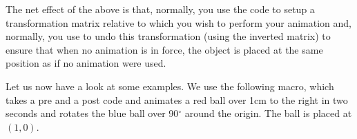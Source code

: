 \begin{command}{\pgfsys@animation@canvas@transform{}}
    The net effect of the above is that, normally, you use the  code
    to setup a transformation matrix relative to which you wish to perform your
    animation and, normally, you use  to undo this transformation
    (using the inverted matrix) to ensure that when no animation is in force,
    the object is placed at the same position as if no animation were used.

    Let us now have a look at some examples. We use the following macro, which
    takes a pre and a post code and animates a red ball over 1cm to the right
    in two seconds and rotates the blue ball over 90$^\circ$ around the origin.
    The ball is placed at $(1,0)$.
\begin{codeexample}
\def\animationcanvasexample#1#2{%
  \animationexample{ball}{}{%
    \pgfsysanimkeycanvastransform{#1}{#2}%
    \pgfsysanimkeytime{0}{1}{1}{0}{0}
    \pgfsysanimvaltranslate{0cm}{0cm}%
    \pgfsysanimkeytime{2}{1}{1}{0}{0}
    \pgfsysanimvaltranslate{1cm}{0cm}%
    \pgfsysanimate{translate}
    \fill [ball color=red,name=ball] (1,0) circle [radius=3mm]; }
  \animationexample{ball}{}{%
    \pgfsysanimkeycanvastransform{#1}{#2}%
    \pgfsysanimkeytime{0}{1}{1}{0}{0}
    \pgfsysanimvalscalar{0}%
    \pgfsysanimkeytime{2}{1}{1}{0}{0}
    \pgfsysanimvalscalar{90}%
    \pgfsysanimate{rotate}
    \fill [ball color=blue,name=ball] (1,0) circle [radius=3mm]; } }
\end{codeexample}
\def\animationcanvasexample#1#2{%
  \animationexample{ball}{}{%
    \pgfsysanimkeycanvastransform{#1}{#2}%
    \pgfsysanimkeytime{0}{1}{1}{0}{0}
    \pgfsysanimvaltranslate{0cm}{0cm}%
    \pgfsysanimkeytime{2}{1}{1}{0}{0}
    \pgfsysanimvaltranslate{1cm}{0cm}%
    \pgfsysanimate{translate}
    \fill [ball color=red,name=ball] (1,0) circle [radius=3mm]; }
  \animationexample{ball}{}{%
    \pgfsysanimkeycanvastransform{#1}{#2}%
    \pgfsysanimkeytime{0}{1}{1}{0}{0}
    \pgfsysanimvalscalar{0}%
    \pgfsysanimkeytime{2}{1}{1}{0}{0}
    \pgfsysanimvalscalar{90}%
    \pgfsysanimate{rotate}
    \fill [ball color=blue,name=ball] (1,0) circle [radius=3mm]; } }


\end{command}
